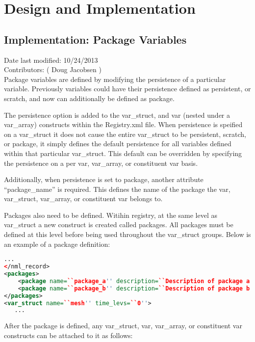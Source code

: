 \documentclass[11pt]{report}
\begin{document}

\chapter{Design and Implementation}
\section{Implementation: Package Variables}
Date last modified: 10/24/2013 \\
Contributors: ( Doug Jacobsen ) \\

Package variables are defined by modifying the persistence of a particular
variable. Previously variables could have their persistence defined as
persistent, or scratch, and now can additionally be defined as package.

The persistence option is added to the var\_struct, and var (nested under a
var\_array) constructs within the Registry.xml file. When persistence is
speified on a var\_struct it does not cause the entire var\_struct to be
persistent, scratch, or package, it simply defines the default persistence for
all variables defined within that particular var\_struct. This default can be
overridden by specifying the persistence on a per var, var\_array, or
constituent var basis.

Additionally, when persistence is set to package, another attribute
``package\_name'' is required. This defines the name of the package the var,
var\_struct, var\_array, or constituent var belongs to.

Packages also need to be defined. Witihin registry, at the same level as
var\_struct a new construct is created called packages. All packages must be
defined at this level before being used throughout the var\_struct groups.
Below is an example of a package definition:

{\scriptsize
\begin{lstlisting}[language=XML]
   ...
</nml_record>
<packages>
	<package name=``package_a'' description=``Description of package a''/>
	<package name=``package_b'' description=``Description of package b''/>
</packages>
<var_struct name=``mesh'' time_levs=``0''>
   ...
\end{lstlisting}
}

After the package is defined, any var\_struct, var, var\_array, or constituent
var constructs can be attached to it as follows:
\end{document}
